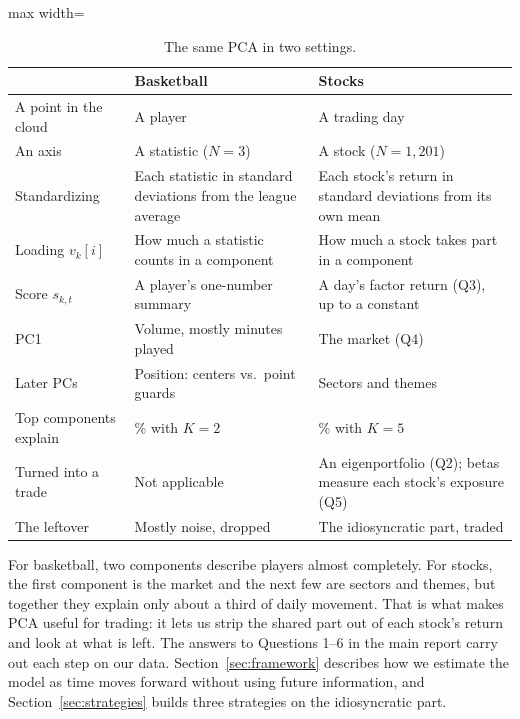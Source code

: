 \documentclass[11pt,letterpaper]{article}
\begin{document}
\begin{table}[!htbp]
    \centering
    \caption{The same PCA in two settings.}
    \label{tab:primer-map}
    \small
    \begin{adjustbox}{max width=\linewidth}
        \begin{tabular}{>{\raggedright\arraybackslash}p{3.4cm} >{\raggedright\arraybackslash}p{5.2cm} >{\raggedright\arraybackslash}p{5.6cm}}
            \toprule
            & Basketball & Stocks \\
            \midrule
            A point in the cloud & A player & A trading day \\
            An axis & A statistic ($N=3$) & A stock ($N=1{,}201$) \\
            Standardizing & Each statistic in standard deviations from the league average & Each stock's return in standard deviations from its own mean \\
            Loading $v_k[i]$ & How much a statistic counts in a component & How much a stock takes part in a component \\
            Score $s_{k,t}$ & A player's one-number summary & A day's factor return (Q3), up to a constant \\
            PC1 & Volume, mostly minutes played & The market (Q4) \\
            Later PCs & Position: centers vs.\ point guards & Sectors and themes \\
            Top components explain & 93\% with $K=2$ & 35\% with $K=5$ \\
            Turned into a trade & Not applicable & An eigenportfolio (Q2); betas measure each stock's exposure (Q5) \\
            The leftover & Mostly noise, dropped & The idiosyncratic part, traded \\
            \bottomrule
        \end{tabular}
    \end{adjustbox}
\end{table}

For basketball, two components describe players almost completely. For
stocks, the first component is the market and the next few are sectors
and themes, but together they explain only about a third of daily
movement. That is what makes PCA useful for trading: it lets us strip the
shared part out of each stock's return and look at what is left. The
answers to Questions 1--6 in the main report carry out each step on our data.
Section~\ref{sec:framework} describes how we estimate the model as time moves forward
without using future information, and Section~\ref{sec:strategies} builds three strategies
on the idiosyncratic part.
\end{document}
